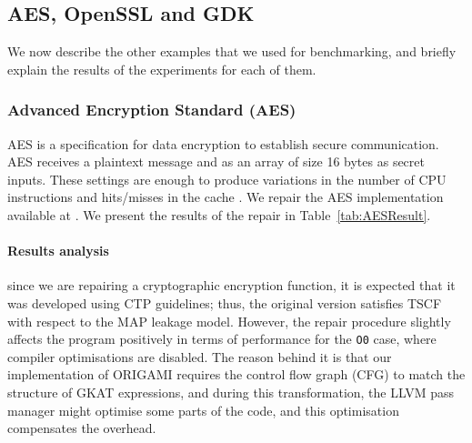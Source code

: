 {%




\subsection{AES, OpenSSL and GDK}
We now describe the other examples that we used for benchmarking, and briefly explain the results of the experiments for each of them. 

\subsubsection{Advanced Encryption Standard (AES)}
AES is a specification for data encryption to establish secure communication. AES receives a plaintext message %
 and as an array of size 16 bytes %
  as secret inputs. These settings are enough to produce variations in the number of CPU instructions and hits/misses in the cache \cite{Chalice}. We repair the AES implementation available at \cite{AESBasic}. %
  We present the results of the repair in Table~\ref{tab:AESResult}. 

\paragraph*{Results analysis} since we are repairing a cryptographic encryption function, it is expected that it was developed using CTP guidelines; thus, the original version satisfies TSCF with respect to the MAP leakage model. However, the repair procedure slightly affects the program positively in terms of performance for the \texttt{O0} case, where compiler optimisations are disabled. The reason behind it is that our implementation of ORIGAMI requires the control flow graph (CFG) to match the structure of GKAT expressions, and during this transformation, the LLVM pass manager might optimise some parts of the code, and this optimisation compensates the overhead.

}
